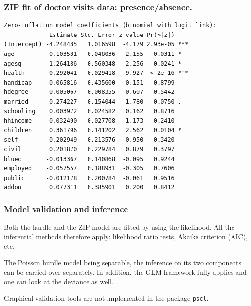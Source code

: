 \documentclass{beamer}
\newcommand{\bs}{\bigskip}
\begin{document}
\begin{frame}[fragile]
\frametitle{ZIP fit of doctor visits data: presence/absence.}

{\scriptsize
\begin{verbatim}
Zero-inflation model coefficients (binomial with logit link):
             Estimate Std. Error z value Pr(>|z|)    
(Intercept) -4.248435   1.016598  -4.179 2.93e-05 ***
age          0.103531   0.048036   2.155   0.0311 *  
agesq       -1.264186   0.560348  -2.256   0.0241 *  
health       0.292041   0.029418   9.927  < 2e-16 ***
handicap    -0.065816   0.435600  -0.151   0.8799    
hdegree     -0.005067   0.008355  -0.607   0.5442    
married     -0.274227   0.154044  -1.780   0.0750 .  
schooling    0.003972   0.024582   0.162   0.8716    
hhincome    -0.032490   0.027708  -1.173   0.2410    
children     0.361796   0.141202   2.562   0.0104 *  
self         0.202949   0.213576   0.950   0.3420    
civil        0.201870   0.229784   0.879   0.3797    
bluec       -0.013367   0.140868  -0.095   0.9244    
employed    -0.057557   0.188931  -0.305   0.7606    
public      -0.012178   0.200784  -0.061   0.9516    
addon        0.077311   0.385901   0.200   0.8412  
\end{verbatim}
}

\end{frame}

\begin{frame}
\frametitle{Model validation and inference}

Both the hurdle and the ZIP model are fitted by using the likelihood. All the
inferential methods therefore apply: likelihood ratio tests, Akaike criterion
(AIC), etc.

\bs
The Poisson hurdle model being separable, the inference on its two
components can be carried over separately. In addition, the GLM framework fully
applies and one can look at the deviance as well. 


\bs
\bs
Graphical validation tools are not implemented in the package \texttt{pscl}.
\end{frame}
\end{document}

